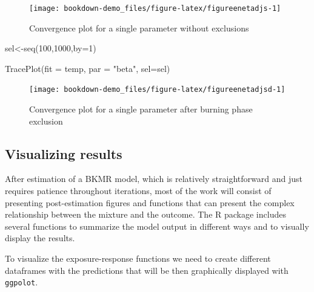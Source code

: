 \documentclass[
]{book}
\newenvironment{Shaded}{\begin{snugshade}}{\end{snugshade}}
\newcommand{\AttributeTok}[1]{\textcolor[rgb]{0.77,0.63,0.00}{#1}}
\newcommand{\DecValTok}[1]{\textcolor[rgb]{0.00,0.00,0.81}{#1}}
\newcommand{\FunctionTok}[1]{\textcolor[rgb]{0.00,0.00,0.00}{#1}}
\newcommand{\NormalTok}[1]{#1}
\newcommand{\OtherTok}[1]{\textcolor[rgb]{0.56,0.35,0.01}{#1}}
\newcommand{\StringTok}[1]{\textcolor[rgb]{0.31,0.60,0.02}{#1}}
\begin{document}
\begin{figure}[H]

{\centering \texttt{[image: bookdown-demo\_files/figure-latex/figureenetadjs-1]} 

}

\caption{Convergence plot for a single parameter without exclusions}\label{fig:figureenetadjs}
\end{figure}

\begin{Shaded}
\begin{Highlighting}[]
\NormalTok{sel}\OtherTok{\textless{}{-}}\FunctionTok{seq}\NormalTok{(}\DecValTok{100}\NormalTok{,}\DecValTok{1000}\NormalTok{,}\AttributeTok{by=}\DecValTok{1}\NormalTok{)}
\end{Highlighting}
\end{Shaded}

\begin{Shaded}
\begin{Highlighting}[]
\FunctionTok{TracePlot}\NormalTok{(}\AttributeTok{fit =}\NormalTok{ temp, }\AttributeTok{par =} \StringTok{"beta"}\NormalTok{, }\AttributeTok{sel=}\NormalTok{sel)}
\end{Highlighting}
\end{Shaded}

\begin{figure}[H]

{\centering \texttt{[image: bookdown-demo\_files/figure-latex/figureenetadjsd-1]} 

}

\caption{Convergence plot for a single parameter after burning phase exclusion}\label{fig:figureenetadjsd}
\end{figure}

\hypertarget{visualizing-results}{%
\subsection{Visualizing results}\label{visualizing-results}}

After estimation of a BKMR model, which is relatively straightforward and just requires patience throughout iterations, most of the work will consist of presenting post-estimation figures and functions that can present the complex relationship between the mixture and the outcome. The R package includes several functions to summarize the model output in different ways and to visually display the results.

To visualize the exposure-response functions we need to create different dataframes with the predictions that will be then graphically displayed with \texttt{ggpolot}.
\end{document}
